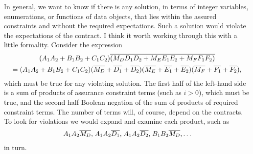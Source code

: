 \documentclass[10pt]{amsart}
\begin{document}
In general, we want to know if there is any solution, in terms of
integer variables, enumerations, or functions of data objects, that
lies within the assured constraints and without the required
expectations.  Such a solution would violate the expectations of the
contract.  I think it worth working through this with a little
formality.  Consider the expression
\begin{multline}
    (A_1A_2+B_1B_2+C_1C_2)\overline{(M_DD_1D_2+M_EE_1E_2+M_FF_1F_2)}
    \\
    =
    (A_1A_2+B_1B_2+C_1C_2)(\overline{M_D}+\overline{D_1}+\overline{D_2})
    (\overline{M_E}+\overline{E_1}+\overline{E_2})(\overline{M_F}+\overline{F_1}+\overline{F_2})
    \text{,}
  \end{multline}
  which must be true for any violating solution.  The first half of
  the left-hand side is a sum of products of assurance constraint
  terms (such as $i>0$), which must be true, and the second half
  Boolean negation of the sum of products of required constraint
  terms.  The number of terms will, of course, depend on the
  contracts.  To look for violations we would expand and examine each
  product, such as
\begin{gather}
  \notag
  \smash{A_1A_2\overline{M_D}}\text{,}\; \smash{A_1A_2\overline{D_1}}\text{,}\;
  \smash{A_1A_2\overline{D_2}}\text{,}\; \smash{B_1B_2\overline{M_D}}\text{,}\ldots
\end{gather}
in turn.
\end{document}

